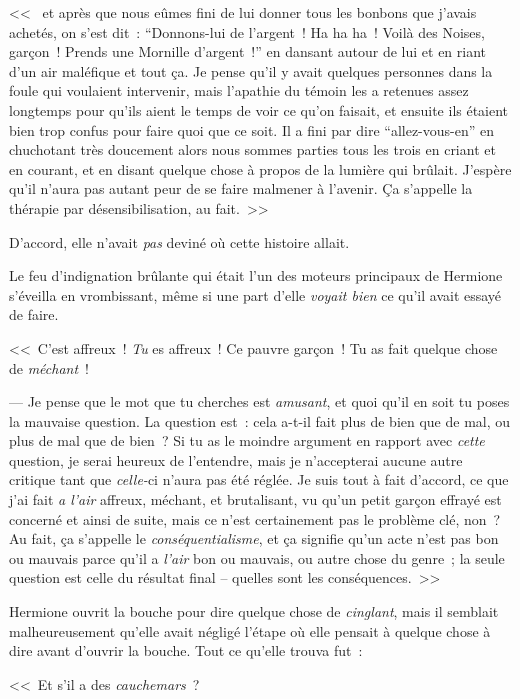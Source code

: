 <<~ et après que nous eûmes fini de lui donner tous les bonbons que j'avais achetés, on s'est dit~: “Donnons-lui de l'argent~! Ha ha ha~! Voilà des Noises, garçon~! Prends une Mornille d'argent~!” en dansant autour de lui et en riant d'un air maléfique et tout ça. Je pense qu'il y avait quelques personnes dans la foule qui voulaient intervenir, mais l'apathie du témoin les a retenues assez longtemps pour qu'ils aient le temps de voir ce qu'on faisait, et ensuite ils étaient bien trop confus pour faire quoi que ce soit. Il a fini par dire “allez-vous-en” en chuchotant très doucement alors nous sommes parties tous les trois en criant et en courant, et en disant quelque chose à propos de la lumière qui brûlait. J'espère qu'il n'aura pas autant peur de se faire malmener à l'avenir. Ça s'appelle la thérapie par désensibilisation, au fait.~>>

D'accord, elle n'avait \emph{pas} deviné où cette histoire allait.

Le feu d'indignation brûlante qui était l'un des moteurs principaux de Hermione s'éveilla en vrombissant, même si une part d'elle \emph{voyait bien} ce qu'il avait essayé de faire.

<<~C'est affreux~! \emph{Tu} es affreux~! Ce pauvre garçon~! Tu as fait quelque chose de \emph{méchant}~!

--- Je pense que le mot que tu cherches est \emph{amusant}, et quoi qu'il en soit tu poses la mauvaise question. La question est~: cela a-t-il fait plus de bien que de mal, ou plus de mal que de bien~? Si tu as le moindre argument en rapport avec \emph{cette} question, je serai heureux de l'entendre, mais je n'accepterai aucune autre critique tant que \emph{celle-}ci n'aura pas été réglée. Je suis tout à fait d'accord, ce que j'ai fait \emph{a l'air} affreux, méchant, et brutalisant, vu qu'un petit garçon effrayé est concerné et ainsi de suite, mais ce n'est certainement pas le problème clé, non~? Au fait, ça s'appelle le \emph{conséquentialisme}, et ça signifie qu'un acte n'est pas bon ou mauvais parce qu'il a \emph{l'air} bon ou mauvais, ou autre chose du genre~; la seule question est celle du résultat final -- quelles sont les conséquences.~>>

Hermione ouvrit la bouche pour dire quelque chose de \emph{cinglant}, mais il semblait malheureusement qu'elle avait négligé l'étape où elle pensait à quelque chose à dire avant d'ouvrir la bouche. Tout ce qu'elle trouva fut~:

<<~Et s'il a des \emph{cauchemars}~?

